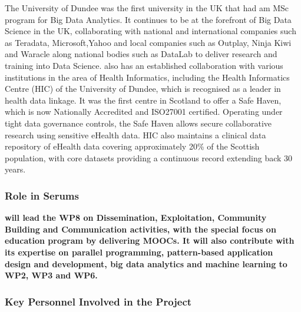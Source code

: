 \documentclass[a4paper,11pt]{article}
\begin{document}
The University of Dundee was the first university in the UK that had am MSc program for Big Data Analytics. It continues to be at the forefront of Big Data Science in the UK, collaborating with national and international companies such as Teradata, Microsoft,Yahoo and local companies such as Outplay, Ninja Kiwi and Waracle along national bodies such as DataLab to deliver research and training into Data Science. \UODshort{} also has an established collaboration with various institutions in the area of Health Informatics, including the Health Informatics Centre (HIC) of the University of Dundee, which is recognised as a leader in health data linkage. It was the first centre in Scotland to offer a Safe Haven, which is now Nationally Accredited and ISO27001 certified. Operating under tight data governance controls, the Safe Haven allows secure collaborative research using sensitive eHealth data. HIC also maintains a clinical data repository of eHealth data covering approximately 20\% of the Scottish population, with core datasets providing a continuous record extending back 30 years.

\subsubsection*{Role in Serums}
\textbf{\UODshort{} will lead the WP8 on Dissemination, Exploitation, Community Building and Communication activities, with the special focus on education program by delivering MOOCs. It will also contribute with its expertise on parallel programming, pattern-based application design and development, big data analytics and machine learning to WP2, WP3 and WP6.}  

\subsubsection*{Key Personnel Involved in the Project}
\end{document}
